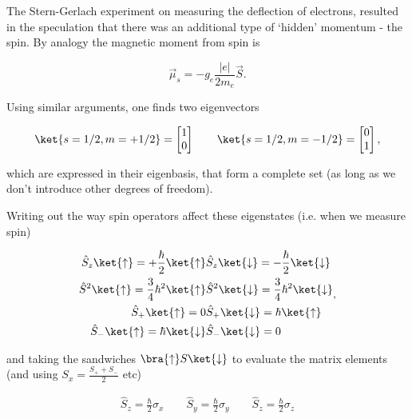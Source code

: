   The Stern-Gerlach experiment on measuring the deflection of electrons, resulted in the speculation that there was an additional type of `hidden' momentum - the spin. By analogy the magnetic moment from spin is
  
  \begin{equation}
  \vec{\mu}_s = -g_e\frac{|e|}{2m_e}\vec{S}.
  \label{eqn:gqmSpin}
  \end{equation}
  
  \noindent Using similar arguments, one finds two eigenvectors
  
  \begin{equation}
  \ket{s=1/2,m=+1/2} = \begin{bmatrix}
  1\\0
  \end{bmatrix}\qquad \ket{s=1/2,m=-1/2} = \begin{bmatrix}
  0 \\1
  \end{bmatrix},
  \end{equation}
  
  \noindent which are expressed in their eigenbasis, that form a complete set (as long as we don't introduce other degrees of freedom).
  
  
  Writing out the way spin operators affect these eigenstates (i.e. when we measure spin)
  
  \begin{equation}
  \begin{aligned}
  \hat{S}_z\ket{\uparrow} = +\frac{\hbar}{2}\ket{\uparrow} & \hat{S}_z\ket{\downarrow} = -\frac{\hbar}{2}\ket{\downarrow}\\
  \hat{S}^2\ket{\uparrow} = \frac{3}{4}\hbar^2\ket{\uparrow} & \hat{S}^2\ket{\downarrow} = \frac{3}{4}\hbar^2\ket{\downarrow}\\
  \hat{S}_+\ket{\uparrow} = 0 &
  \hat{S}_+\ket{\downarrow} = \hbar\ket{\uparrow}\\
  \hat{S}_-\ket{\uparrow} = \hbar\ket{\downarrow} &
  \hat{S}_-\ket{\downarrow} = 0\\
  \end{aligned},
  \end{equation}
  
  \noindent and taking the sandwiches $\bra{\uparrow}S\ket{\downarrow}$ to evaluate the matrix elements (and using $S_x = \frac{S_++S_-}{2}$ etc)
  
  \begin{equation}
  \begin{aligned}
  \hat{S}_z = \frac{\hbar}{2}\sigma_x \qquad \hat{S}_y = \frac{\hbar}{2}\sigma_y \qquad \hat{S}_z = \frac{\hbar}{2}\sigma_z
  \end{aligned}
  \label{eqn:gqmPauli}
  \end{equation}
  
